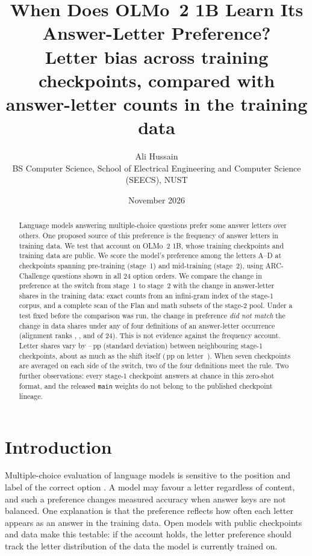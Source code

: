 \documentclass[11pt,a4paper]{article}
\title{When Does OLMo~2 1B Learn Its Answer-Letter Preference?\\[2pt]
\large Letter bias across training checkpoints, compared with answer-letter counts in the training data}
\author{Ali Hussain\\ \small BS Computer Science, School of Electrical Engineering and Computer Science (SEECS), NUST}
\date{November 2026}
\newcommand{\pp}{\,pp}
\begin{document}
\maketitle

\begin{abstract}
Language models answering multiple-choice questions prefer some answer letters over others. One proposed source of this preference is the frequency of answer letters in training data. We test that account on OLMo~2 1B, whose training checkpoints and training data are public. We score the model's preference among the letters A--D at \NScored{} checkpoints spanning pre-training (stage~1) and mid-training (stage~2), using \NQuestions{} ARC-Challenge questions shown in all 24 option orders. We compare the change in preference at the switch from stage~1 to stage~2 with the change in answer-letter shares in the training data: exact counts from an infini-gram index of the stage-1 corpus, and a complete scan of the Flan and math subsets of the stage-2 pool. Under a test fixed before the comparison was run, the change in preference \emph{did not match} the change in data shares under any of four definitions of an answer-letter occurrence (alignment ranks \RankSameline, \RankStrict, \RankMatched{} and \RankMix{} of 24). This is not evidence against the frequency account. Letter shares vary by \SdStageOneMin--\SdStageOneMax\pp{} (standard deviation) between neighbouring stage-1 checkpoints, about as much as the shift itself (\ShiftMax\pp{} on letter~\ShiftMaxLabel). When seven checkpoints are averaged on each side of the switch, two of the four definitions meet the rule. Two further observations: every stage-1 checkpoint answers at chance in this zero-shot format, and the released \texttt{main} weights do not belong to the published checkpoint lineage.
\end{abstract}

\section{Introduction}
Multiple-choice evaluation of language models is sensitive to the position and label of the correct option \citep{zheng2024,ok2026,lee2026}. A model may favour a letter regardless of content, and such a preference changes measured accuracy when answer keys are not balanced. One explanation is that the preference reflects how often each letter appears as an answer in the training data. Open models with public checkpoints and data make this testable: if the account holds, the letter preference should track the letter distribution of the data the model is currently trained on.
\end{document}
